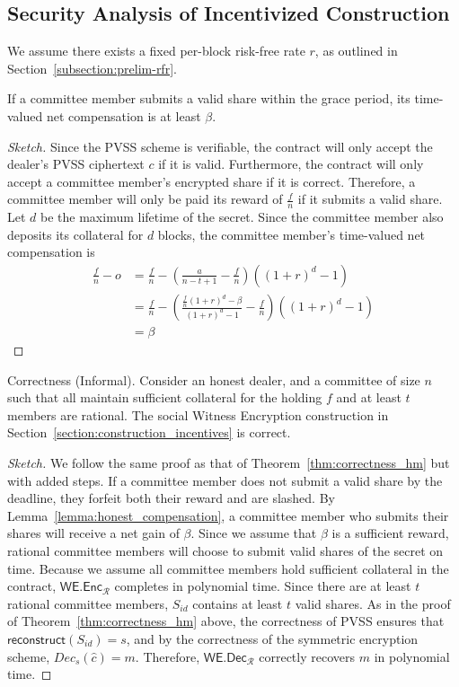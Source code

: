 \subsection{Security Analysis of Incentivized Construction}
We assume there exists a fixed per-block risk-free rate $r$, as outlined in Section~\ref{subsection:prelim-rfr}.
\begin{lemma}\label{lemma:honest_compensation}
    If a committee member submits a valid share within the grace period, its time-valued net compensation is at least $\beta$.
\end{lemma}
\begin{proof}[Sketch]
    Since the PVSS scheme is verifiable, the contract will only accept the dealer's PVSS ciphertext $c$ if it is valid.
    Furthermore, the contract will only accept a committee member's encrypted share if it is correct.
    Therefore, a committee member will only be paid its reward of $\frac{f}{n}$ if it submits a valid share.
    Let $d$ be the maximum lifetime of the secret.
    Since the committee member also deposits its collateral for $d$ blocks, the committee member's time-valued net compensation is
    \begin{align*}
        \frac{f}{n} - o &= \frac{f}{n} - (\frac{a}{n - t + 1} - \frac{f}{n})((1 + r)^d - 1) \\
        &= \frac{f}{n} - (\frac{\frac{f}{n}(1 + r)^d - \beta}{(1 + r)^d - 1} - \frac{f}{n})((1 + r)^d - 1) \\
        &= \beta
    \end{align*}
\end{proof}
\begin{theorem}{Correctness (Informal).}
    Consider an honest dealer, and a committee of size $n$ such that all maintain sufficient collateral for the holding $f$ and at least $t$ members are rational.
    The social Witness Encryption construction in Section~\ref{section:construction_incentives} is correct.
\end{theorem}
\begin{proof}[Sketch]
    We follow the same proof as that of Theorem~\ref{thm:correctness_hm} but with added steps.
    If a committee member does not submit a valid share by the deadline, they forfeit both their reward and are slashed.
    By Lemma~\ref{lemma:honest_compensation}, a committee member who submits their shares will receive a net gain of $\beta$.
    Since we assume that $\beta$ is a sufficient reward, rational committee members will choose to submit valid shares of the secret on time.
    Because we assume all committee members hold sufficient collateral in the contract, $\textsf{WE.Enc}_\mathcal{R}$ completes in polynomial time.
    Since there are at least $t$ rational committee members, $S_{id}$ contains at least $t$ valid shares.
    As in the proof of Theorem~\ref{thm:correctness_hm} above, the correctness of PVSS ensures that $\textsf{reconstruct}(S_{id}) = s$, and by the correctness of the symmetric encryption scheme, $Dec_s(\hat{c}) = m$.
    Therefore, $\textsf{WE.Dec}_\mathcal{R}$ correctly recovers $m$ in polynomial time.
\end{proof}
